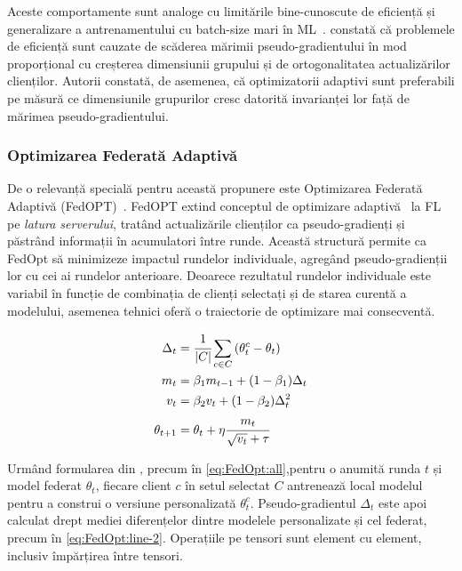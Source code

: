 Aceste comportamente sunt analoge cu limitările bine-cunoscute de eficiență și generalizare a antrenamentului cu batch-size mari în ML~\citep{LargeBatchGenGapSharpMinima}. \citet{LargeCohorts} constată că problemele de eficiență sunt cauzate de scăderea mărimii pseudo-gradientului în mod proporțional cu creșterea dimensiunii grupului și de ortogonalitatea actualizărilor clienților. Autorii constată, de asemenea, că optimizatorii adaptivi sunt preferabili pe măsură ce dimensiunile grupurilor cresc datorită invarianței lor față de mărimea pseudo-gradientului.

\subsubsection{Optimizarea Federată Adaptivă}

De o relevanță specială pentru această propunere este Optimizarea Federată Adaptivă (FedOPT)~\citep{FedOPT}. FedOPT extind conceptul de optimizare adaptivă~\citep{Adam} la FL pe \textit{latura serverului}, tratând actualizările clienților ca pseudo-gradienți și păstrând informații în acumulatori între runde. Această structură permite ca FedOpt să minimizeze impactul rundelor individuale, agregând pseudo-gradienții lor cu cei ai rundelor anterioare. Deoarece rezultatul rundelor individuale este variabil în funcție de combinația de clienți selectați și de starea curentă a modelului, asemenea tehnici oferă o traiectorie de optimizare mai consecventă.

\begin{subequations}
    \begin{align}
        \Delta_t     & = \cfrac{1}{|C|} \sum_{c \in C} \left( \theta_t^c - \theta_t \right) \label{eq:FedOpt:line-2} \\
        m_t          & = \beta_1 m_{t-1} + (1-\beta_1) \Delta_t \label{eq:FedOpt:line-3}                             \\
        v_t          & = \beta_2 v_t + (1-\beta_2) \Delta_t^2 \label{eq:FedOpt:line-4}                               \\
        \theta_{t+1} & = \theta_t + \eta \cfrac{m_t}{\sqrt{v_t} + \tau} \label{eq:FedOpt:line-5}
    \end{align}
    \label{eq:FedOpt:all}
\end{subequations}

\noindent Urmând formularea din \citet{FedOPT}, precum în \cref{eq:FedOpt:all},pentru o anumită runda $t$ și model federat $\theta_t$, fiecare client $c$ în setul selectat $C$ antrenează local modelul pentru a construi o versiune personalizată $\theta_t^c$. Pseudo-gradientul $\Delta_t$ este apoi calculat drept mediei diferențelor dintre modelele personalizate și cel federat, precum în \cref{eq:FedOpt:line-2}. Operațiile pe tensori sunt element cu element, inclusiv împărțirea între tensori.

